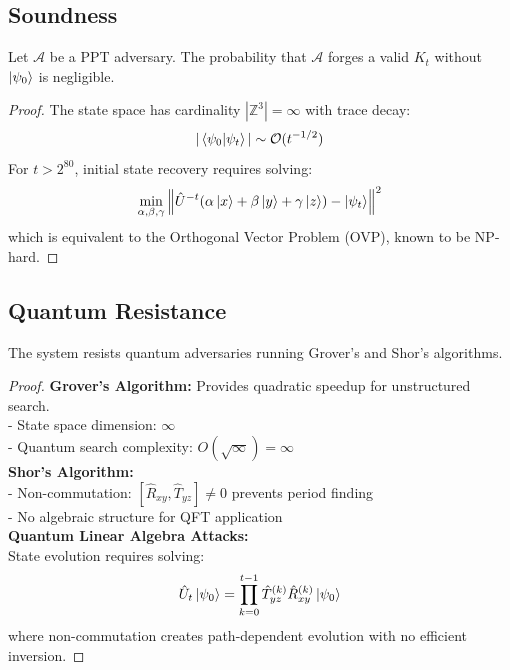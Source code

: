 \documentclass[12pt]{article}
\begin{document}
\subsection{Soundness}

\begin{theorem}
Let $\mathcal{A}$ be a PPT adversary. The probability that $\mathcal{A}$ forges a valid $K_t$ without $\ket{\psi_0}$ is negligible.
\end{theorem}

\begin{proof}
The state space has cardinality $|\mathbb{Z}^3| = \infty$ with trace decay:
\[
|\braket{\psi_0 | \psi_t}| \sim \mathcal{O}(t^{-1/2})
\]
For $t > 2^{80}$, initial state recovery requires solving:
\[
\min_{\alpha,\beta,\gamma} \norm{\hat{U}^{-t}(\alpha\ket{x} + \beta\ket{y} + \gamma\ket{z}) - \ket{\psi_t}}^2
\]
which is equivalent to the Orthogonal Vector Problem (OVP), known to be NP-hard.
\end{proof}

\subsection{Quantum Resistance}

\begin{theorem}
The system resists quantum adversaries running Grover's and Shor's algorithms.
\end{theorem}

\begin{proof}
\textbf{Grover's Algorithm:} Provides quadratic speedup for unstructured search. \\
- State space dimension: $\infty$ \\
- Quantum search complexity: $O(\sqrt{\infty}) = \infty$ \\

\textbf{Shor's Algorithm:} \\
- Non-commutation: $[\hat{R}_{xy}, \hat{T}_{yz}] \neq 0$ prevents period finding \\
- No algebraic structure for QFT application \\

\textbf{Quantum Linear Algebra Attacks:} \\
State evolution requires solving:
\[
\hat{U}_t\ket{\psi_0} = \prod_{k=0}^{t-1} \hat{T}_{yz}^{(k)} \hat{R}_{xy}^{(k)} \ket{\psi_0}
\]
where non-commutation creates path-dependent evolution with no efficient inversion.
\end{proof}
\end{document}
